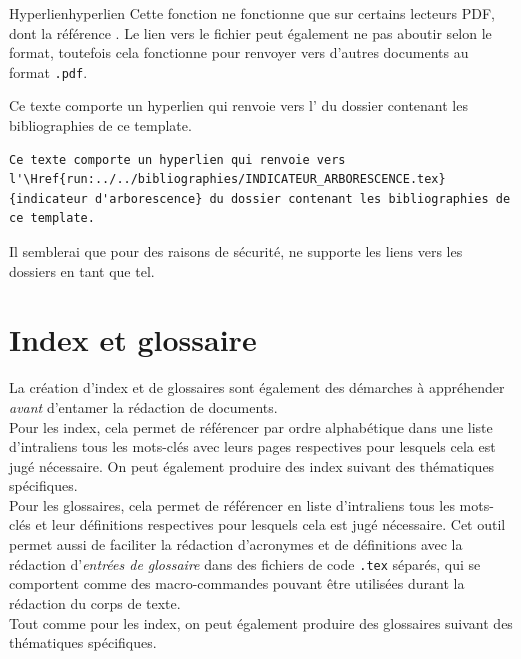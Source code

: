 \documentclass[a4paper, 11pt, twoside, fleqn]{memoir}
\begin{document}
\begin{exemple}{Hyperlien}{hyperlien}
Cette fonction ne fonctionne que sur certains lecteurs PDF, dont la référence . Le lien vers le fichier peut également ne pas aboutir selon le format, toutefois cela fonctionne pour renvoyer vers d'autres documents au format \texttt{.pdf}.\\

\begin{minipage}[t]{0.49\linewidth}
Ce texte comporte un hyperlien qui renvoie vers l' du dossier contenant les bibliographies de ce template.
\end{minipage}
	\hfill
\begin{minipage}[t]{0.49\linewidth}
\begin{verbatim}
Ce texte comporte un hyperlien qui renvoie vers l'\Href{run:../../bibliographies/INDICATEUR_ARBORESCENCE.tex}{indicateur d'arborescence} du dossier contenant les bibliographies de ce template.
\end{verbatim}
\end{minipage}

Il semblerai que pour des raisons de sécurité,  ne supporte les liens vers les dossiers en tant que tel.

\end{exemple}

	\section{Index et glossaire}
	
La création d'index et de glossaires sont également des démarches à appréhender \emph{avant} d'entamer la rédaction de documents.\\ 

Pour les index, cela permet de référencer par ordre alphabétique dans une liste d'intraliens tous les mots-clés avec leurs pages respectives pour lesquels cela est jugé nécessaire. On peut également produire des index suivant des thématiques spécifiques.\\

Pour les glossaires, cela permet de référencer en liste d'intraliens tous les mots-clés et leur définitions respectives pour lesquels cela est jugé nécessaire. Cet outil permet aussi de faciliter la rédaction d'acronymes et de définitions avec la rédaction d'\emph{entrées de glossaire} dans des fichiers de code \texttt{.tex} séparés, qui se comportent comme des macro-commandes pouvant être utilisées durant la rédaction du corps de texte. \\ 
Tout comme pour les index, on peut également produire des glossaires suivant des thématiques spécifiques.\\
\end{document}

